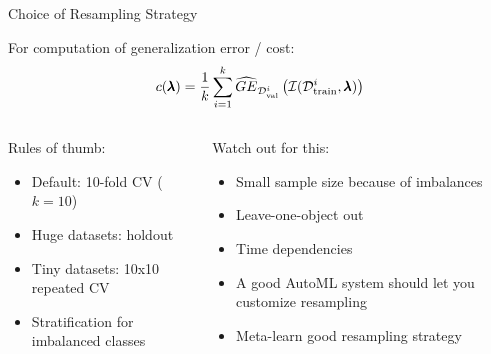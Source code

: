 \begin{frame}{Choice of Resampling Strategy}
  
  For computation of generalization error / cost:
  \begin{equation*}
    c(\pmb{\lambda}) = \frac{1}{k}\sum_{i = 1}^k \widehat{GE}_{\mathcal{D}_{\text{val}}^i}\left(\mathcal{I}(\mathcal{D}_{\text{train}}^i, \pmb{\lambda})\right)
  \end{equation*}

  \vspace{1em}
  \begin{columns}
    \begin{column}{0.5\textwidth}
    Rules of thumb:
    \begin{itemize}
      \item Default: 10-fold CV ($k=10$)
      \item Huge datasets: holdout
      \item Tiny datasets: 10x10 repeated CV
      \item Stratification for imbalanced classes
    \end{itemize}
    \end{column}
    
    \begin{column}{0.5\textwidth}
    	\pause
 Watch out for this:       
    \begin{itemize}
      \item Small sample size because of imbalances    
      \item Leave-one-object out
      \item Time dependencies
      \item A good AutoML system should let you customize resampling
      \item Meta-learn good resampling strategy~
    \end{itemize}
    \end{column}
    \end{columns}
    
\end{frame}

